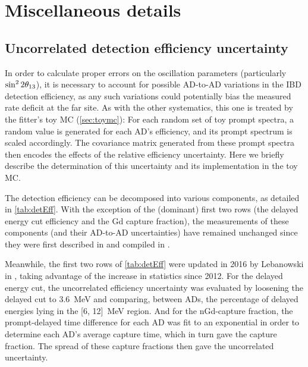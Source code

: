 \documentclass[../thesis.tex]{subfiles}
\begin{document}
\chapter{Miscellaneous details}
\label{chap:misc}

\section{Uncorrelated detection efficiency uncertainty}
\label{sec:miscDetEff}

In order to calculate proper errors on the oscillation parameters (particularly $\sin^2 2\theta_{13}$), it is necessary to account for possible AD-to-AD variations in the IBD detection efficiency, as any such variations could potentially bias the measured rate deficit at the far site. As with the other systematics, this one is treated by the fitter's toy MC (\autoref{sec:toymc}): For each random set of toy prompt spectra, a random value is generated for each AD's efficiency, and its prompt spectrum is scaled accordingly. The covariance matrix generated from these prompt spectra then encodes the effects of the relative efficiency uncertainty. Here we briefly describe the determination of this uncertainty and its implementation in the toy MC.

The detection efficiency can be decomposed into various components, as detailed in \autoref{tab:detEff}. With the exception of the (dominant) first two rows (the delayed energy cut efficiency and the Gd capture fraction), the measurements of these components (and their AD-to-AD uncertainties) have remained unchanged since they were first described in \cite{SideBySide} and compiled in \cite{PhysRevLett.108.171803}.

Meanwhile, the first two rows of \autoref{tab:detEff} were updated in 2016 by Lebanowski in \cite{loganDetEff}, taking advantage of the increase in statistics since 2012. For the delayed energy cut, the uncorrelated efficiency uncertainty was evaluated by loosening the delayed cut to 3.6~MeV and comparing, between ADs, the percentage of delayed energies lying in the [6, 12]~MeV region. And for the nGd-capture fraction, the prompt-delayed time difference for each AD was fit to an exponential in order to determine each AD's average capture time, which in turn gave the capture fraction. The spread of these capture fractions then gave the uncorrelated uncertainty.
\end{document}
